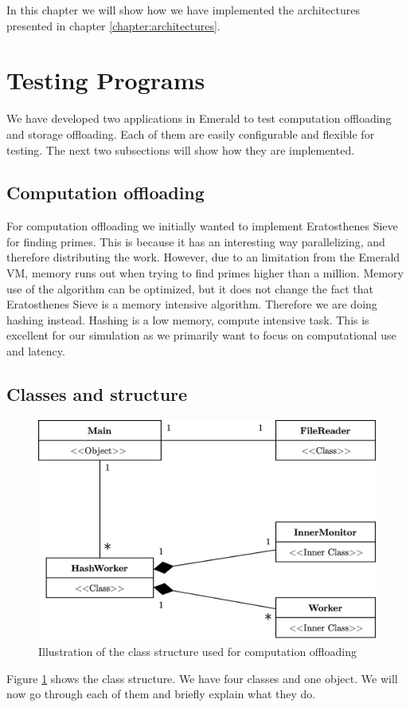 In this chapter we will show how we have implemented the architectures presented in chapter \ref{chapter:architectures}.

\section{Testing Programs}
We have developed two applications in Emerald to test computation offloading and storage offloading. Each of them are easily configurable and flexible for testing. The next two subsections will show how they are implemented.

\subsection{Computation offloading}
For computation offloading we initially wanted to implement Eratosthenes Sieve for finding primes. This is because it has an interesting way parallelizing, and therefore distributing the work. However, due to an limitation from the Emerald VM, memory runs out when trying to find primes higher than a million. Memory use of the algorithm can be optimized, but it does not change the fact that Eratosthenes Sieve is a memory intensive algorithm. Therefore we are doing hashing instead. Hashing is a low memory, compute intensive task. This is excellent for our simulation as we primarily want to focus on computational use and latency.






\subsection{Classes and structure}
\begin{figure}[t]
    \centering
    \includegraphics[scale=0.9]{chapters/implementation/figures/HashWorker_class_diagram.png}
    \caption{Illustration of the class structure used for computation offloading}
    \label{fig:HashWorker_class_diagram}
\end{figure}
Figure \ref{fig:HashWorker_class_diagram} shows the class structure. We have four classes and one object. We will now go through each of them and briefly explain what they do.


